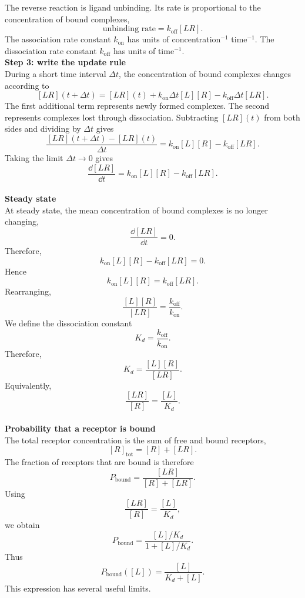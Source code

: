 The reverse reaction is ligand unbinding.
Its rate is proportional to the concentration of bound complexes,
\[
    \text{unbinding rate} = k_{\mathrm{off}}[LR].
\]
The association rate constant $k_{\mathrm{on}}$ has units of concentration$^{-1}$ time$^{-1}$.
The dissociation rate constant $k_{\mathrm{off}}$ has units of time$^{-1}$.
% 
% 
\medskip
\\
\textbf{Step 3: write the update rule}
\\
During a short time interval $\Delta t$, the concentration of bound complexes changes according to
\[
    [LR](t+\Delta t) = [LR](t) + k_{\mathrm{on}}\Delta t[L][R] - k_{\mathrm{off}}\Delta t[LR].
\]
The first additional term represents newly formed complexes.
The second represents complexes lost through dissociation.
Subtracting $[LR](t)$ from both sides and dividing by $\Delta t$ gives
\[
    \frac{[LR](t+\Delta t)-[LR](t)}{\Delta t} = k_{\mathrm{on}}[L][R] - k_{\mathrm{off}}[LR].
\]
Taking the limit $\Delta t\rightarrow0$ gives
\[
    \boxed{\frac{\dd[LR]}{\dd t} = k_{\mathrm{on}}[L][R] - k_{\mathrm{off}}[LR].}
\]
% 
% 
\medskip
\\
\textbf{Steady state}
\\
At steady state, the mean concentration of bound complexes is no longer changing,
\[
    \frac{\dd[LR]}{\dd t} = 0.
\]
Therefore,
\[
    k_{\mathrm{on}}[L][R] - k_{\mathrm{off}}[LR] = 0.
\]
Hence
\[
    k_{\mathrm{on}}[L][R] = k_{\mathrm{off}}[LR].
\]
Rearranging,
\[
    \frac{[L][R]}{[LR]} = \frac{k_{\mathrm{off}}}{k_{\mathrm{on}}}.
\]
We define the dissociation constant
\[
    \boxed{K_d = \frac{k_{\mathrm{off}}}{k_{\mathrm{on}}}.}
\]
Therefore,
\[
    K_d = \frac{[L][R]}{[LR]}.
\]
Equivalently,
\[
    \frac{[LR]}{[R]} = \frac{[L]}{K_d}.
\]
% 
% 
\medskip
\\
\textbf{Probability that a receptor is bound}
\\
The total receptor concentration is the sum of free and bound receptors,
\[
    [R]_{\mathrm{tot}} = [R] + [LR].
\]
The fraction of receptors that are bound is therefore
\[
    P_{\mathrm{bound}} = \frac{[LR]}{[R]+[LR]}.
\]
Using
\[
    \frac{[LR]}{[R]} = \frac{[L]}{K_d},
\]
we obtain
\[
    P_{\mathrm{bound}} = \frac{[L]/K_d}{1+[L]/K_d}.
\]
Thus
\[
    \boxed{P_{\mathrm{bound}}([L]) = \frac{[L]}{K_d+[L]}.}
\]
This expression has several useful limits.

